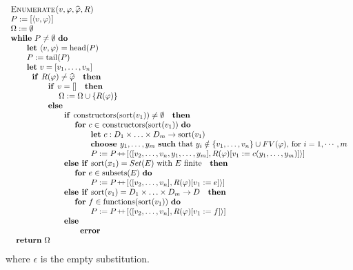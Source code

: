 \documentclass{article}
\providecommand{\concat}{\ensuremath{\hspace{0.12em}\raisebox{0.2ex}{\text{\scriptsize+}\!\text{\scriptsize+}}\hspace{0.12em}}}
\begin{document}
\bigskip 
\[
\begin{tabular}{l}
\textsc{Enumerate(}$v,\varphi ,\widehat{\varphi },R$\textsc{)} \\ 
$P:=[\left\langle v,\varphi \right\rangle ]$ \\ 
$\Omega :=\emptyset $ \\ 
\textbf{while} $P\neq \emptyset $ \textbf{do} \\ 
\qquad \textbf{let} $\left\langle v,\varphi \right\rangle =\mathrm{head}(P)$
\\ 
\qquad $P:=\mathrm{tail}(P)$ \\ 
\qquad \textbf{let} $v=[v_{1},\ldots ,v_{n}]$ \\ 
\qquad $\text{\textbf{if }}R(\varphi )\neq \widehat{\varphi }\text{ \textbf{%
then}}$ \\ 
\qquad \qquad $\text{\textbf{if }}v=[]\text{ \textbf{then}}$ \\ 
\qquad \qquad \qquad $\Omega :=\Omega \cup \left\{ R(\varphi )\right\} $ \\ 
\qquad \qquad $\text{\textbf{else}}$ \\ 
\qquad \qquad \qquad $\text{\textbf{if }}\mathrm{constructors}(\mathrm{sort}%
(v_{1}))\neq \emptyset \text{ \textbf{then}}$ \\ 
\qquad \qquad \qquad \qquad \textbf{for} $c\in $ $\mathrm{constructors}(%
\mathrm{sort}(v_{1}))$ \textbf{do} \\ 
\qquad \qquad \qquad \qquad \qquad \textbf{let} $c:D_{1}\times \ldots \times
D_{m}\rightarrow \mathrm{sort}(v_{1})$ \\ 
\qquad \qquad \qquad \qquad \qquad \textbf{choose }$y_{1},\ldots ,y_{m}$ 
\textbf{such} that $y_{i}\notin \{v_{1},\ldots ,v_{n}\}\cup FV(\varphi )$,
for $i=1,\cdots ,m$ \\ 
\qquad \qquad \qquad \qquad \qquad $P:=P\concat\lbrack \left\langle
[v_{2},\ldots ,v_{n},y_{1},\ldots ,y_{m}],R(\varphi )[v_{1}:=c(y_{1},\ldots
,y_{m})]\right\rangle ]$ \\ 
\qquad \qquad \qquad $\text{\textbf{else if }}\mathrm{sort}(x_{1})=Set(E)$
with $E$ finite$\text{ \textbf{then}}$ \\ 
\qquad \qquad \qquad \qquad \textbf{for} $e\in \mathrm{subsets}(E)$ \textbf{%
do} \\ 
\qquad \qquad \qquad \qquad \qquad $P:=P\concat\lbrack \left\langle
[v_{2},\ldots ,v_{n}],R(\varphi )[v_{1}:=e]\right\rangle ]$ \\ 
\qquad \qquad \qquad $\text{\textbf{else if }}\mathrm{sort}%
(v_{1})=D_{1}\times \ldots \times D_{m}\rightarrow D\text{ \textbf{then}}$
\\ 
\qquad \qquad \qquad \qquad \textbf{for} $f\in \mathrm{functions}(\mathrm{%
sort}(v_{1}))$ \textbf{do} \\ 
\qquad \qquad \qquad \qquad \qquad $P:=P\concat\lbrack \left\langle
[v_{2},\ldots ,v_{n}],R(\varphi )[v_{1}:=f]\right\rangle ]$ \\ 
\qquad \qquad \qquad $\text{\textbf{else}}$ \\ 
\qquad \qquad \qquad \qquad $\text{\textbf{error}}$ \\ 
$\text{\textbf{return}}$ $\Omega $%
\end{tabular}%
\]%
where $\epsilon $ is the empty substitution.
\end{document}
